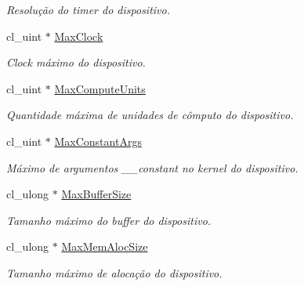 \begin{DoxyCompactItemize}
\begin{DoxyCompactList}\small\item\em Resolução do timer do dispositivo. \end{DoxyCompactList}\item 
\hypertarget{structdevices_a386df2295358d2717730bc1db4539671}{}\label{structdevices_a386df2295358d2717730bc1db4539671} 
cl\+\_\+uint $\ast$ \hyperlink{structdevices_a386df2295358d2717730bc1db4539671}{Max\+Clock}
\begin{DoxyCompactList}\small\item\em Clock máximo do dispositivo. \end{DoxyCompactList}\item 
\hypertarget{structdevices_aec780718e368f1df19727f500a921c7d}{}\label{structdevices_aec780718e368f1df19727f500a921c7d} 
cl\+\_\+uint $\ast$ \hyperlink{structdevices_aec780718e368f1df19727f500a921c7d}{Max\+Compute\+Units}
\begin{DoxyCompactList}\small\item\em Quantidade máxima de unidades de cômputo do dispositivo. \end{DoxyCompactList}\item 
\hypertarget{structdevices_adfc4f33bb5055dc345007f64acbe7feb}{}\label{structdevices_adfc4f33bb5055dc345007f64acbe7feb} 
cl\+\_\+uint $\ast$ \hyperlink{structdevices_adfc4f33bb5055dc345007f64acbe7feb}{Max\+Constant\+Args}
\begin{DoxyCompactList}\small\item\em Máximo de argumentos \+\_\+\+\_\+constant no kernel do dispositivo. \end{DoxyCompactList}\item 
\hypertarget{structdevices_aa075a9705e12e7e949f89b1306f59585}{}\label{structdevices_aa075a9705e12e7e949f89b1306f59585} 
cl\+\_\+ulong $\ast$ \hyperlink{structdevices_aa075a9705e12e7e949f89b1306f59585}{Max\+Buffer\+Size}
\begin{DoxyCompactList}\small\item\em Tamanho máximo do buffer do dispositivo. \end{DoxyCompactList}\item 
\hypertarget{structdevices_a3969a7352c8edd8b1b057630a0d7e8e1}{}\label{structdevices_a3969a7352c8edd8b1b057630a0d7e8e1} 
cl\+\_\+ulong $\ast$ \hyperlink{structdevices_a3969a7352c8edd8b1b057630a0d7e8e1}{Max\+Mem\+Aloc\+Size}
\begin{DoxyCompactList}\small\item\em Tamanho máximo de alocação do dispositivo. \end{DoxyCompactList}\item 

\end{DoxyCompactItemize}
